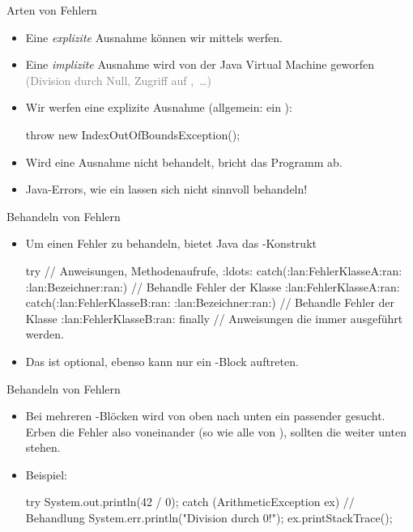 \begin{frame}[fragile]{Arten von Fehlern}
    \begin{itemize}[<+(1)->]
        \widei
        \item Eine \emph{explizite} Ausnahme können wir mittels  werfen.
        \item Eine \emph{implizite} Ausnahme wird von der Java Virtual Machine geworfen \textcolor{gray}{(Division durch Null, Zugriff auf ,~\ldots)}
        \item Wir werfen eine explizite Ausnahme (allgemein: ein ): \pause{}
\begin{plainjava}
throw new IndexOutOfBoundsException();
\end{plainjava}
        \item Wird eine Ausnahme nicht behandelt, bricht das Programm ab.
        \item Java-Errors, wie ein  lassen sich nicht sinnvoll behandeln!
    \end{itemize}
\end{frame}

\begin{frame}[fragile]{Behandeln von Fehlern}
    \begin{itemize}[<+(1)->]
        \widei
        \item Um einen Fehler zu behandeln, bietet Java das -Konstrukt
\begin{plainjava}
try {
    // Anweisungen, Methodenaufrufe, :ldots:
} catch(:lan:FehlerKlasseA:ran: :lan:Bezeichner:ran:) {
    // Behandle Fehler der Klasse :lan:FehlerKlasseA:ran:
} catch(:lan:FehlerKlasseB:ran: :lan:Bezeichner:ran:) {
    // Behandle Fehler der Klasse :lan:FehlerKlasseB:ran:
} finally {
    // Anweisungen die immer ausgeführt werden.
}
\end{plainjava}
        \item Das  ist optional, ebenso kann nur ein -Block auftreten.
    \end{itemize}
\end{frame}


\begin{frame}[fragile]{Behandeln von Fehlern}
    \begin{itemize}[<+(1)->]
        \widei
        \item Bei mehreren -Blöcken wird von oben nach unten ein passender gesucht.\pause{} Erben die Fehler also voneinander (so wie alle von ),\pause{} sollten die  weiter unten stehen.
        \item Beispiel:\pause{}
\begin{plainjava}
try {
    System.out.println(42 / 0);
} catch (ArithmeticException ex) {
    // Behandlung
    System.err.println("Division durch 0!");
    ex.printStackTrace();
}
\end{plainjava}
    \end{itemize}
\end{frame}

